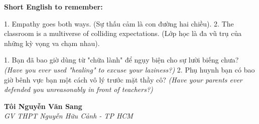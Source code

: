 \begin{ghinhoanh}
\textbf{Short English to remember:}

1. Empathy goes both ways. (Sự thấu cảm là con đường hai chiều).
2. The classroom is a multiverse of colliding expectations. (Lớp học là đa vũ trụ của những kỳ vọng va chạm nhau).
\end{ghinhoanh}

\begin{tuhocnhanh}
1. Bạn đã bao giờ dùng từ "chữa lành" để ngụy biện cho sự lười biếng chưa? \textit{(Have you ever used "healing" to excuse your laziness?)}
2. Phụ huynh bạn có bao giờ bênh vực bạn một cách vô lý trước mặt thầy cô? \textit{(Have your parents ever defended you unreasonably in front of teachers?)}
\end{tuhocnhanh}

\begin{flushright}
\textbf{Tôi Nguyễn Văn Sang}\\
\textit{GV THPT Nguyễn Hữu Cảnh - TP HCM}
\end{flushright}

\ngancach
